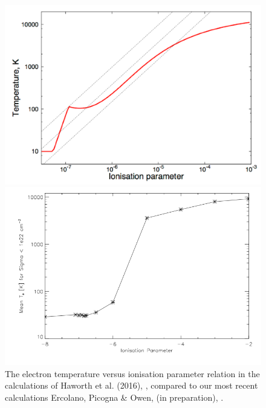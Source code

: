 \documentclass[10pt,fleqn,twoside]{article}
\begin{document}
\begin{figure}
\centering
\begin{minipage}[b]{.47\textwidth}
  \centering
  \includegraphics[width=0.95\linewidth]{xite_a.pdf}
\end{minipage}%
\hspace{0.05\textwidth}
\begin{minipage}[b]{.47\textwidth}
  \centering
  \includegraphics[width=\linewidth]{a.png}
\end{minipage}
\caption{The electron temperature versus ionisation parameter relation
in the calculations of Haworth et al. (2016), , compared to
our most recent calculations Ercolano, Picogna \& Owen, (in
preparation), .}
  \label{fig:xite}
\end{figure}
\end{document}
